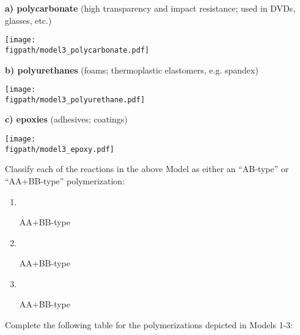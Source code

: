 \begin{activity}
\begin{model}
\vspace{0.1in}

\textbf{a) polycarbonate} (high transparency and impact resistance; used in DVDs, glasses, etc.)
		
			\centerline{\texttt{[image: \\figpath/model3\_polycarbonate.pdf]}}

\vspace{0.1in}

\textbf{b) polyurethanes} (foams; thermoplastic elastomers, e.g. spandex)
		
			\centerline{\texttt{[image: \\figpath/model3\_polyurethane.pdf]}}

\vspace{0.1in}

\textbf{c) epoxies} (adhesives; coatings)
		
			\centerline{\texttt{[image: \\figpath/model3\_epoxy.pdf]}}

\end{model}

\vspace{0.25in}
\begin{ctqs}

		\question Classify each of the reactions in the above Model as either an ``AB-type'' or ``AA+BB-type'' polymerization:
		
			\begin{enumerate}
				\item ~ \begin{solution}[0.6in]AA+BB-type\end{solution}
				\item ~ \begin{solution}[0.6in]AA+BB-type\end{solution}
				\item ~ \begin{solution}[0.6in]AA+BB-type\end{solution}
			\end{enumerate}
			
		
		\clearpage
		\question Complete the following table for the polymerizations depicted in Models 1-3:
		

\end{ctqs}
\end{activity}
